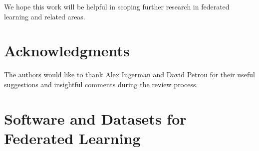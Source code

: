 \documentclass[11pt]{article}
\begin{document}
We hope this work will be helpful in scoping further research in federated learning and related areas.


\section*{Acknowledgments}

The authors would like to thank Alex Ingerman and David Petrou for their useful suggestions and insightful comments during the review process. 

\pagebreak

\begin{small}

\end{small}

\appendix


\section{Software and Datasets for Federated Learning}
\label{sec:datasets-and-software}
\end{document}
